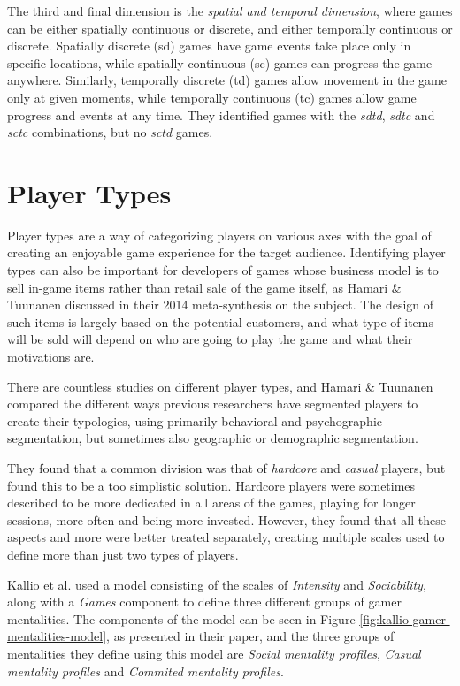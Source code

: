 The third and final dimension is the \emph{spatial and temporal dimension}, where games can be either spatially continuous or discrete, and either temporally continuous or discrete. Spatially discrete (sd) games have game events take place only in specific locations, while spatially continuous (sc) games can progress the game anywhere. Similarly, temporally discrete (td) games allow movement in the game only at given moments, while temporally continuous (tc) games allow game progress and events at any time. They identified games with the \emph{sdtd}, \emph{sdtc} and \emph{sctc} combinations, but no \emph{sctd} games.


\section{Player Types}
\label{sec:player-types}

Player types are a way of categorizing players on various axes with the goal of creating an enjoyable game experience for the target audience. Identifying player types can also be important for developers of games whose business model is to sell in-game items rather than retail sale of the game itself, as Hamari \& Tuunanen \cite{hamari2014playertypes} discussed in their 2014 meta-synthesis on the subject. The design of such items is largely based on the potential customers, and what type of items will be sold will depend on who are going to play the game and what their motivations are.

There are countless studies on different player types, and Hamari \& Tuunanen \cite{hamari2014playertypes} compared the different ways previous researchers have segmented players to create their typologies, using primarily behavioral and psychographic segmentation, but sometimes also geographic or demographic segmentation.

They found that a common division was that of \emph{hardcore} and \emph{casual} players, but found this to be a too simplistic solution. Hardcore players were sometimes described to be more dedicated in all areas of the games, playing for longer sessions, more often and being more invested. However, they found that all these aspects and more were better treated separately, creating multiple scales used to define more than just two types of players.

Kallio et al. \cite{kallio2011gamermentalities} used a model consisting of the scales of \emph{Intensity} and \emph{Sociability}, along with a \emph{Games} component to define three different groups of gamer mentalities. The components of the model can be seen in Figure \ref{fig:kallio-gamer-mentalities-model}, as presented in their paper, and the three groups of mentalities they define using this model are \emph{Social mentality profiles}, \emph{Casual mentality profiles} and \emph{Commited mentality profiles}.

